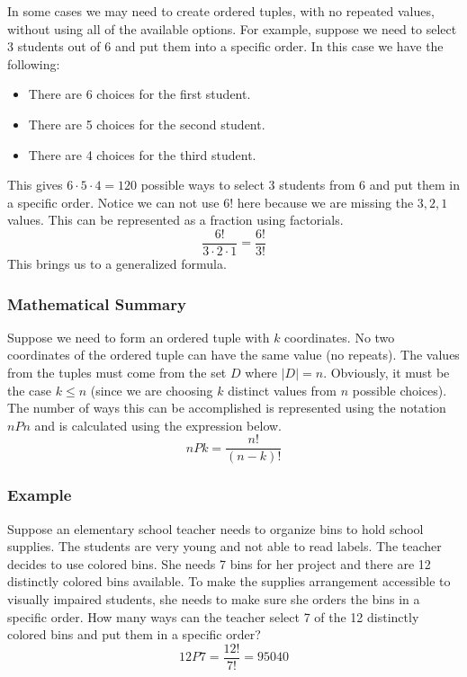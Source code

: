In some cases we may need to create ordered tuples, with no repeated values, without using all of the available options.  For example, suppose we need to select 3 students out of 6 and put them into a specific order.  In this case we have the following:
\begin{itemize}
    \item There are 6 choices for the first student.
    \item There are 5 choices for the second student.
    \item There are 4 choices for the third student.
\end{itemize}

This gives $6 \cdot 5 \cdot 4   = 120$ possible ways to select 3 students from 6 and put them in a specific order.    Notice we can not use $6!$ here because we are missing the $3,2,1$ values.  This can be represented as a fraction using factorials.
$$\frac{6!}{3 \cdot 2 \cdot 1} = \frac{6!}{3!}$$
This brings us to a generalized formula.
\subsubsection*{Mathematical Summary}
Suppose we need to form an ordered tuple with $k$ coordinates.  No two coordinates of the ordered tuple can have the same value (no repeats).  The values from the tuples must come from the set $D$ where $|D| = n$.  Obviously, it must be the case $k \leq n$ (since we are choosing $k$ distinct values from $n$ possible choices). The number of ways this can be accomplished is represented using the notation $nPn$ and is calculated using the expression below.
$$nPk = \frac{n!}{(n-k)!}$$

\subsubsection*{Example}
Suppose an elementary school teacher needs to organize bins to hold school supplies.  The students are very young and not able to read labels.  The teacher decides to use colored bins.  She needs 7 bins for her project and there are 12 distinctly colored bins available. To make the supplies arrangement accessible to visually impaired students, she needs to make sure she orders the bins in a specific order. How many ways can the teacher select 7 of the 12 distinctly colored bins and put them in a specific order?
$$12P7 = \frac{12!}{7!} = 95040$$

